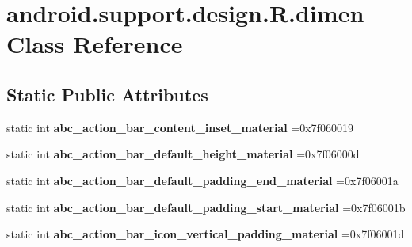 \hypertarget{classandroid_1_1support_1_1design_1_1R_1_1dimen}{}\section{android.\+support.\+design.\+R.\+dimen Class Reference}
\label{classandroid_1_1support_1_1design_1_1R_1_1dimen}
\subsection*{Static Public Attributes}
\begin{DoxyCompactItemize}
\item 
\mbox{\label{classandroid_1_1support_1_1design_1_1R_1_1dimen_a827e720dc2fbeb6a791d66c81aec91a8}} 
static int {\bfseries abc\+\_\+action\+\_\+bar\+\_\+content\+\_\+inset\+\_\+material} =0x7f060019
\item 
\mbox{\label{classandroid_1_1support_1_1design_1_1R_1_1dimen_ad0745748e9f370328a1b893eaeba9c67}} 
static int {\bfseries abc\+\_\+action\+\_\+bar\+\_\+default\+\_\+height\+\_\+material} =0x7f06000d
\item 
\mbox{\label{classandroid_1_1support_1_1design_1_1R_1_1dimen_a643e40d63e76393c6339f9f03f0e8c44}} 
static int {\bfseries abc\+\_\+action\+\_\+bar\+\_\+default\+\_\+padding\+\_\+end\+\_\+material} =0x7f06001a
\item 
\mbox{\label{classandroid_1_1support_1_1design_1_1R_1_1dimen_a2afefd30bfec8f91e0d245549c1ac4b8}} 
static int {\bfseries abc\+\_\+action\+\_\+bar\+\_\+default\+\_\+padding\+\_\+start\+\_\+material} =0x7f06001b
\item 
\mbox{\label{classandroid_1_1support_1_1design_1_1R_1_1dimen_af0c3c5d3b3ea5dba575ef2c8eeba9ea9}} 
static int {\bfseries abc\+\_\+action\+\_\+bar\+\_\+icon\+\_\+vertical\+\_\+padding\+\_\+material} =0x7f06001d
\item 
\mbox{\label{classandroid_1_1support_1_1design_1_1R_1_1dimen_a84034abbe05b072490d0a76df394642c}} 

\end{DoxyCompactItemize}
